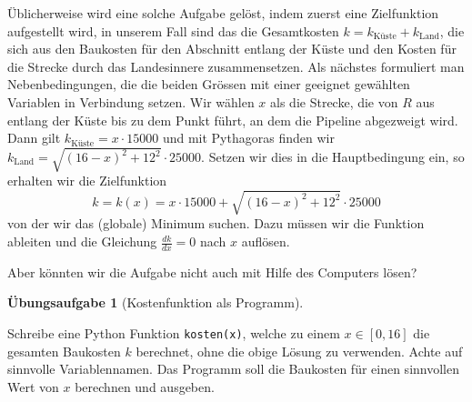 \documentclass[
  a4paper,
  DIV=11]{scrreprt}
\theoremstyle{definition}
\newtheorem{exercise}{Übungsaufgabe}[chapter]
\theoremstyle{definition}
\theoremstyle{remark}
\begin{document}
Üblicherweise wird eine solche Aufgabe gelöst, indem zuerst eine
Zielfunktion aufgestellt wird, in unserem Fall sind das die Gesamtkosten
\(k = k_\textrm{Küste} + k_\textrm{Land}\), die sich aus den Baukosten
für den Abschnitt entlang der Küste und den Kosten für die Strecke durch
das Landesinnere zusammensetzen. Als nächstes formuliert man
Nebenbedingungen, die die beiden Grössen mit einer geeignet gewählten
Variablen in Verbindung setzen. Wir wählen \(x\) als die Strecke, die
von \(R\) aus entlang der Küste bis zu dem Punkt führt, an dem die
Pipeline abgezweigt wird. Dann gilt \(k_\textrm{Küste} = x\cdot 15000\)
und mit Pythagoras finden wir
\(k_\textrm{Land} = \sqrt{(16-x)^2 + 12^2}\cdot 25000\). Setzen wir dies
in die Hauptbedingung ein, so erhalten wir die Zielfunktion \[
k = k(x) = x\cdot 15000 + \sqrt{(16-x)^2 + 12^2}\cdot 25000
\] von der wir das (globale) Minimum suchen. Dazu müssen wir die
Funktion ableiten und die Gleichung \(\frac{dk}{dx}=0\) nach \(x\)
auflösen.

Aber könnten wir die Aufgabe nicht auch mit Hilfe des Computers lösen?

\begin{exercise}[Kostenfunktion als
Programm]\protect\hypertarget{exr-OptimierungsproblemProgrammieren}{}\label{exr-OptimierungsproblemProgrammieren}

Schreibe eine Python Funktion \texttt{kosten(x)}, welche zu einem
\(x\in[0,16]\) die gesamten Baukosten \(k\) berechnet, ohne die obige
Lösung zu verwenden. Achte auf sinnvolle Variablennamen. Das Programm
soll die Baukosten für einen sinnvollen Wert von \(x\) berechnen und
ausgeben.

\end{exercise}
\end{document}
